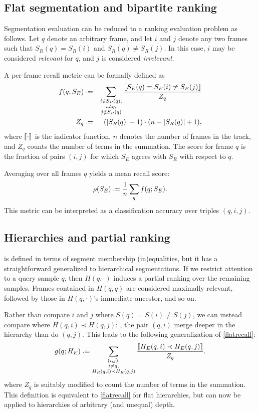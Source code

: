 \documentclass{article}
\begin{document}
\subsection{Flat segmentation and bipartite ranking}

Segmentation evaluation can be reduced to a ranking evaluation problem as follows.
Let $q$ denote an arbitrary frame, and let $i$ and $j$ denote any two frames such that $S_R(q) = S_R(i)$ and $S_R(q) \neq S_R(j)$.
In this case, $i$ may be considered \emph{relevant} for $q$, and $j$ is considered \emph{irrelevant}.

A per-frame recall metric can be formally defined as
\begin{align}
f(q ; S_E) &\defeq &
\sum_{\substack{i \in S_R(q), \\ i \neq q,\\ j \notin S_R(q)}}
\frac{\ind{S_E(q) = S_E(i) \neq S_E(j) }}{Z_q} \label{flatrecall}\\
Z_q &\defeq& (|S_R(q)| - 1)\cdot (n - |S_R(q)| + 1), \label{flatrecallnorm}
\end{align}
where $\left\llbracket\cdot\right\rrbracket$ is the indicator function, $n$ denotes the number of frames in the track, and $Z_q$
counts the number of terms in the summation.
The score for frame $q$ is the fraction of pairs $(i, j)$ for which $S_E$
agrees with $S_R$ with respect to $q$.

Averaging over all frames $q$ yields a mean recall score:
\begin{equation}
\rho(S_E) \defeq \frac{1}{n} \sum_q f(q ; S_E).\label{avgrecall}
\end{equation}
This metric can be interpreted as a classification accuracy over triples $(q, i, j)$.


\subsection{Hierarchies and partial ranking}

 is defined in terms of segment membership (in)equalities, but it has a straightforward 
generalized to hierarchical segmentations.
If we restrict attention to a query sample $q$, then $H(q, \cdot)$ induces a partial ranking over the remaining samples.
Frames contained in $H(q, q)$ are considered maximally relevant, followed by those in $H(q, \cdot)$'s immediate ancestor, and so on.

Rather than compare $i$ and $j$ where $S(q) = S(i) \neq S(j)$, we can instead compare where
$H(q, i) \prec H(q, j)$: \ie, the pair $(q,i)$ merge deeper in the hierarchy than do $(q,j)$.
This leads to the following generalization of \cref{flatrecall}:
\begin{equation}
g(q ; H_E) \defeq \sum_{\substack{(i, j),\\ i \neq q,\\ H_R(q, i) \prec H_R(q, j)}}
\frac{\ind{H_E(q, i) \prec H_E(q, j)}}{Z_q}.\label{hierrecall}
\end{equation}
where $Z_q$ is suitably modified to count the number of terms in the summation.
This definition is equivalent to \cref{flatrecall} for flat hierarchies, but can now be applied to
hierarchies of arbitrary (and unequal) depth.
\end{document}

